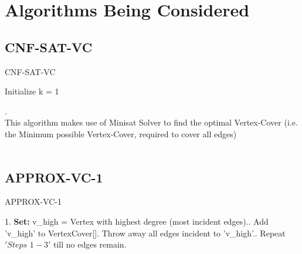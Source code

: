 \documentclass[11pt]{llncs}
\begin{document}



%
%
%

\vspace{-10mm}
\section{Algorithms Being Considered}
\subsection{CNF-SAT-VC}
	\begin{algorithm}[H]
		\caption{CNF-SAT-VC}\label{getgpx}

		\DontPrintSemicolon
		\SetAlgoLined

		\;

		Initialize k = 1\;
	\end{algorithm}

	.\\
	This algorithm makes use of Minisat Solver \cite{minisat} to find the optimal Vertex-Cover (i.e. the Minimum possible Vertex-Cover, required to cover all edges)\\\\


\subsection{APPROX-VC-1}
	\vspace{-1mm}
	
	\begin{algorithm}[H]
		\caption{APPROX-VC-1 \cite{prj_pdf}}\label{getgpx}

		\DontPrintSemicolon
		\SetAlgoLined

		1. \textbf{Set:} v\_high = Vertex with highest degree (most incident edges).. Add 'v\_high' to VertexCover[]. Throw away all edges incident to 'v\_high'.. Repeat $'Steps \,\, 1-3'$ till no edges remain.\;
	\end{algorithm}
\end{document}
